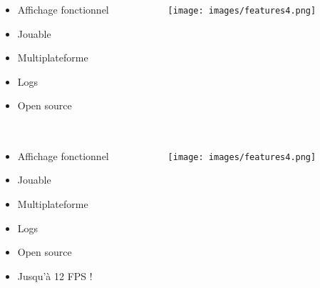 \documentclass{beamer}
\begin{document}
\begin{frame}
	\frametitle{\secname}
  \framesubtitle{\subsecname}
  \begin{columns}[T]
		\begin{column}{.50\textwidth}
      \begin{itemize}
        \item Affichage fonctionnel
        \item Jouable
        \item Multiplateforme
        \item Logs
        \item Open source
      \end{itemize}
		\end{column}
    \begin{column}{.50\textwidth}
			\begin{figure}
				\texttt{[image: images/features4.png]}
			\end{figure}
		\end{column}
	\end{columns}
\end{frame}
\begin{frame}
	\frametitle{\secname}
  \framesubtitle{\subsecname}
  \begin{columns}[T]
		\begin{column}{.50\textwidth}
      \begin{itemize}
        \item Affichage fonctionnel
        \item Jouable
        \item Multiplateforme
        \item Logs
        \item Open source
        \item Jusqu'à 12 FPS !
      \end{itemize}
		\end{column}
    \begin{column}{.50\textwidth}
			\begin{figure}
				\texttt{[image: images/features4.png]}
			\end{figure}
		\end{column}
	\end{columns}
\end{frame}

\end{document}
